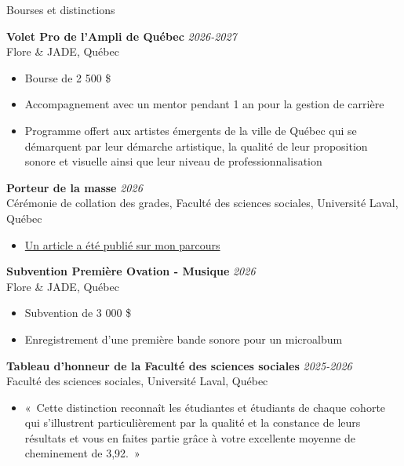 \documentclass{resume} %
\begin{document}
\begin{rSection}{Bourses et distinctions}

{\bf Volet Pro de l'Ampli de Québec} \hfill {\em 2026-2027}
\\ Flore \& JADE, Québec
\begin{itemize}
	\vspace{-0.1cm}\item Bourse de 2 500 \$
    \vspace{-0.3cm}\item Accompagnement avec un mentor pendant 1 an pour la gestion de carrière
    \vspace{-0.3cm}\item Programme offert aux artistes émergents de la ville de Québec qui se démarquent par leur démarche artistique, la qualité de leur proposition sonore et visuelle ainsi que leur niveau de professionnalisation
\end{itemize}

{\bf Porteur de la masse} \hfill {\em 2026}
\\ Cérémonie de collation des grades, Faculté des sciences sociales, Université Laval, Québec
\begin{itemize}
	\vspace{-0.1cm}\item {\href{https://nouvelles.ulaval.ca/2026/06/26/antoine-desrosiers-le-politologue-musicien-6d584cde-e412-4fea-b561-124c3fdf04ae}{Un article a été publié sur mon parcours}}
\end{itemize}

{\bf Subvention Première Ovation - Musique} \hfill {\em 2026}
\\ Flore \& JADE, Québec
\begin{itemize}
	\vspace{-0.1cm}\item Subvention de 3 000 \$
    \vspace{-0.3cm}\item Enregistrement d'une première bande sonore pour un microalbum
\end{itemize}

{\bf Tableau d'honneur de la Faculté des sciences sociales} \hfill {\em 2025-2026}
\\ Faculté des sciences sociales, Université Laval, Québec
\begin{itemize}
	\vspace{-0.1cm}\item «~Cette distinction reconnaît les étudiantes et étudiants de chaque cohorte qui s'illustrent particulièrement par la qualité et la constance de leurs résultats et vous en faites partie grâce à votre excellente moyenne de cheminement de 3,92.~»
\end{itemize}


\end{rSection}
\end{document}
